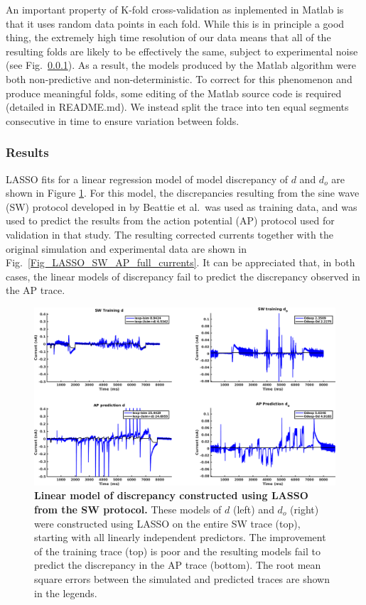 \documentclass[11pt,a4paper,oneside]{article}
\begin{document}
{An important property of K-fold cross-validation as inplemented in Matlab is that it uses random data points in each fold. While this is in principle a good thing, the extremely high time resolution of our data means that all of the resulting folds are likely to  be effectively the same, subject to experimental noise (see Fig.~\ref{}). As a result, the models produced by the Matlab algorithm were both non-predictive and non-deterministic. To correct for this phenomenon and produce meaningful folds, some editing of the Matlab source code is required (detailed in README.md). We instead split the trace into ten equal segments consecutive in time to ensure variation between folds.

\subsubsection{Results}

LASSO fits for a linear regression model of model discrepancy of $d$ and $d_o$ are shown in Figure \ref{Fig_LASSO_SW_AP_full_discrepancy}. For this model, the discrepancies resulting from the sine wave (SW) protocol developed in by Beattie et al.~was used as training data, and was used to predict the results from the action potential (AP) protocol used for validation in that study. The resulting corrected currents together with the original simulation and experimental data are shown in Fig.~\ref{Fig_LASSO_SW_AP_full_currents}. It can be appreciated that, in both cases, the linear models of discrepancy fail to predict the discrepancy observed in the AP trace.

\begin{figure}[t]
\begin{center}
\includegraphics[scale=0.42]{Figures/LASSO_SW_AP_full_discrepancy.png}
\caption{\textbf{Linear model of discrepancy constructed using LASSO from the SW protocol.} These models of $d$ (left) and $d_o$ (right) were constructed using LASSO on the entire SW trace (top), starting with all linearly independent predictors. The improvement of the training trace (top) is poor and the resulting models fail to predict the discrepancy in the AP trace (bottom). The root mean square errors between the simulated and predicted traces are shown in the legends. } 
\label{Fig_LASSO_SW_AP_full_discrepancy}
\end{center}
\end{figure}

}
\end{document}
